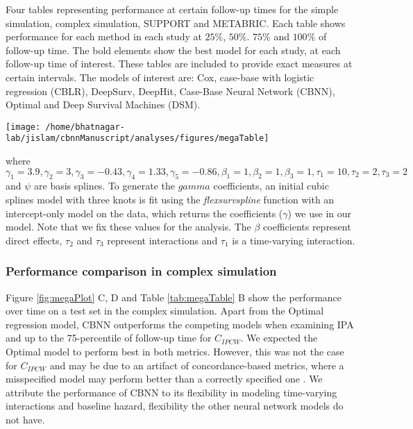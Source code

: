 \documentclass[AMA,STIX1COL,]{WileyNJD-v2}
\begin{document}
\FloatBarrier
\begin{table}
\caption{Four tables representing performance at certain follow-up times for the simple simulation, complex simulation, SUPPORT and METABRIC. Each table shows performance for each method in each study at $25\%$, $50\%$. $75\%$ and $100\%$ of follow-up time. The bold elements show the best model for each study, at each follow-up time of interest. These tables are included to provide exact measures at certain intervals. The models of interest are: Cox, case-base with logistic regression (CBLR), DeepSurv, DeepHit, Case-Base Neural Network (CBNN), Optimal and Deep Survival Machines (DSM).}
\label{tab:megaTable}

\begin{center}\texttt{[image: /home/bhatnagar-lab/jislam/cbnnManuscript/analyses/figures/megaTable]} \end{center}

\end{table}
\FloatBarrier

where
\(\gamma_{1}=3.9, \gamma_{2}=3, \gamma_{3}=-0.43, \gamma_{4}=1.33,\gamma_{5}=-0.86, \beta_{{1}}=1, \beta_{{2}}=1, \beta_{{3}}=1, \tau_{1}=10, \tau_{2}=2, \tau_{3}=2\)
and \(\psi\) are basis splines. To generate the \(gamma\) coefficients,
an initial cubic splines model with three knots is fit using the
\emph{flexsurvspline} function with an intercept-only model on the data,
which returns the coefficients (\(\gamma\)) we use in our model. Note
that we fix these values for the analysis. The \(\beta\) coefficients
represent direct effects, \(\tau_{2}\) and \({\tau_3}\) represent
interactions and \(\tau_{1}\) is a time-varying interaction.

\hypertarget{performance-comparison-in-complex-simulation}{%
\subsubsection{Performance comparison in complex
simulation}\label{performance-comparison-in-complex-simulation}}

Figure \ref{fig:megaPlot} C, D and Table \ref{tab:megaTable} B show the
performance over time on a test set in the complex simulation. Apart
from the Optimal regression model, CBNN outperforms the competing models
when examining IPA and up to the 75-percentile of follow-up time for
\(C_{IPCW}\). We expected the Optimal model to perform best in both
metrics. However, this was not the case for \(C_{IPCW}\) and may be due
to an artifact of concordance-based metrics, where a misspecified model
may perform better than a correctly specified one
\citep{cindexfails2019}. We attribute the performance of CBNN to its
flexibility in modeling time-varying interactions and baseline hazard,
flexibility the other neural network models do not have.
\end{document}
